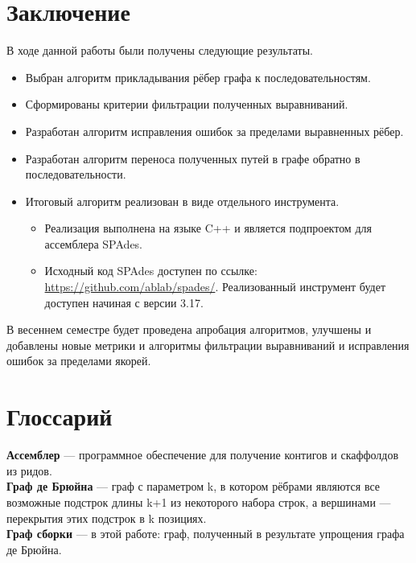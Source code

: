 \documentclass[14pt]{matmex-diploma-custom}
\begin{document}
\section*{Заключение}
В ходе данной работы были получены следующие результаты.
\begin{itemize}
    \item Выбран алгоритм прикладывания рёбер графа к последовательностям.
    \item Сформированы критерии фильтрации полученных выравниваний.
    \item Разработан алгоритм исправления ошибок за пределами выравненных рёбер.
    \item Разработан алгоритм переноса полученных путей в графе обратно в последовательности.
    \item Итоговый алгоритм реализован в виде отдельного инструмента.
    \begin{itemize}
        \item Реализация выполнена на языке C++ и является подпроектом для ассемблера SPAdes.
        \item \begin{sloppypar} Исходный код SPAdes доступен по ссылке: \mbox{\url{https://github.com/ablab/spades/}}. Реализованный инструмент будет доступен начиная с версии 3.17. \end{sloppypar}
    \end{itemize}
\end{itemize}

В весеннем семестре будет проведена апробация алгоритмов, улучшены и добавлены новые метрики и алгоритмы фильтрации выравниваний и исправления ошибок за пределами якорей.


\section*{Глоссарий}

\textbf{Ассемблер} --- программное обеспечение для получение контигов и скаффолдов из ридов.\\

\textbf{Граф де Брюйна} --- граф с параметром k, в котором рёбрами являются все возможные подстрок длины k+1 из некоторого набора строк, а вершинами --- перекрытия этих подстрок в k позициях.\\

\textbf{Граф сборки} --- в этой работе: граф, полученный в результате упрощения графа де Брюйна.\\
\end{document}
